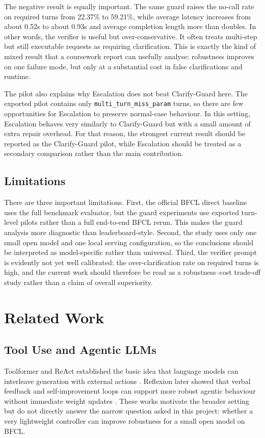\documentclass[10pt,twocolumn]{article}
\begin{document}
The negative result is equally important. The same guard raises the no-call rate on required turns from 22.37\% to 59.21\%, while average latency increases from about 0.52s to about 0.93s and average completion length more than doubles. In other words, the verifier is useful but over-conservative. It often treats multi-step but still executable requests as requiring clarification. This is exactly the kind of mixed result that a coursework report can usefully analyse: robustness improves on one failure mode, but only at a substantial cost in false clarifications and runtime.

The pilot also explains why Escalation does not beat Clarify-Guard here. The exported pilot contains only \texttt{multi\_turn\_miss\_param} turns, so there are few opportunities for Escalation to preserve normal-case behaviour. In this setting, Escalation behaves very similarly to Clarify-Guard but with a small amount of extra repair overhead. For that reason, the strongest current result should be reported as the Clarify-Guard pilot, while Escalation should be treated as a secondary comparison rather than the main contribution.

\subsection{Limitations}
There are three important limitations. First, the official BFCL direct baseline uses the full benchmark evaluator, but the guard experiments use exported turn-level pilots rather than a full end-to-end BFCL rerun. This makes the guard analysis more diagnostic than leaderboard-style. Second, the study uses only one small open model and one local serving configuration, so the conclusions should be interpreted as model-specific rather than universal. Third, the verifier prompt is evidently not yet well calibrated: the over-clarification rate on required turns is high, and the current work should therefore be read as a robustness--cost trade-off study rather than a claim of overall superiority.

\section{Related Work}
\subsection{Tool Use and Agentic LLMs}
Toolformer and ReAct established the basic idea that language models can interleave generation with external actions \citep{schick2023toolformer,yao2023react}. Reflexion later showed that verbal feedback and self-improvement loops can support more robust agentic behaviour without immediate weight updates \citep{shinn2023reflexion}. These works motivate the broader setting but do not directly answer the narrow question asked in this project: whether a very lightweight controller can improve robustness for a small open model on BFCL.
\end{document}
